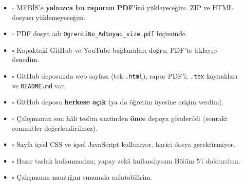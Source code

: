 \documentclass[12pt,a4paper]{article}
\begin{document}
\begin{itemize}[label={}]
  \item $\square$ MEBİS'e \textbf{yalnızca bu raporun PDF'ini} yükleyeceğim. ZIP ve HTML dosyası yüklemeyeceğim.
  \item $\square$ PDF dosya adı \texttt{OgrenciNo\_AdSoyad\_vize.pdf} biçiminde.
  \item $\square$ Kapaktaki GitHub ve YouTube bağlantıları doğru; PDF'te tıklayıp denedim.
  \item $\square$ GitHub deposunda web sayfası (tek \texttt{.html}), rapor PDF'i, \texttt{.tex} kaynakları ve \texttt{README.md} var.
  \item $\square$ GitHub deposu \textbf{herkese açık} (ya da öğretim üyesine erişim verdim).
  \item $\square$ Çalışmamın son hâli teslim saatinden \textbf{önce} depoya gönderildi (sonraki commitler değerlendirilmez).
  \item $\square$ Sayfa içsel CSS ve içsel JavaScript kullanıyor, harici dosya gerektirmiyor.
  \item $\square$ Hazır taslak kullanmadım; yapay zekâ kullandıysam Bölüm 5'i doldurdum.
  \item $\square$ Çalışmanın mantığını sunumda anlatabilirim.
\end{itemize}
\end{document}
